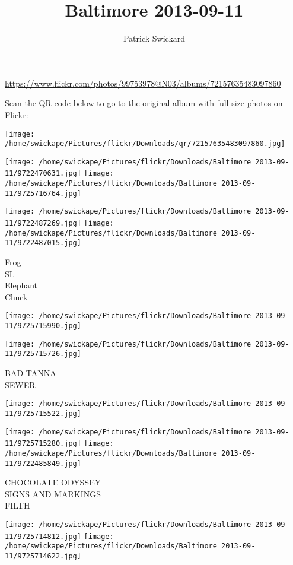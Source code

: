 \documentclass[10pt,letterpaper]{article}
\title{Baltimore 2013-09-11}
\author{Patrick Swickard}
\date{}
\begin{document}
\maketitle

\url{https://www.flickr.com/photos/99753978@N03/albums/72157635483097860}

Scan the QR code below to go to the original album with full-size photos on Flickr:

\texttt{[image: /home/swickape/Pictures/flickr/Downloads/qr/72157635483097860.jpg]}
\pagebreak

\texttt{[image: /home/swickape/Pictures/flickr/Downloads/Baltimore 2013-09-11/9722470631.jpg]}
\texttt{[image: /home/swickape/Pictures/flickr/Downloads/Baltimore 2013-09-11/9725716764.jpg]}

\texttt{[image: /home/swickape/Pictures/flickr/Downloads/Baltimore 2013-09-11/9722487269.jpg]}
\texttt{[image: /home/swickape/Pictures/flickr/Downloads/Baltimore 2013-09-11/9722487015.jpg]}

Frog\\
SL\\
Elephant\\
Chuck
\pagebreak

\texttt{[image: /home/swickape/Pictures/flickr/Downloads/Baltimore 2013-09-11/9725715990.jpg]}

\vspace{0.25in}
\texttt{[image: /home/swickape/Pictures/flickr/Downloads/Baltimore 2013-09-11/9725715726.jpg]}

BAD TANNA\\
SEWER
\pagebreak

\texttt{[image: /home/swickape/Pictures/flickr/Downloads/Baltimore 2013-09-11/9725715522.jpg]}

\vspace{0.25in}
\texttt{[image: /home/swickape/Pictures/flickr/Downloads/Baltimore 2013-09-11/9725715280.jpg]}
\texttt{[image: /home/swickape/Pictures/flickr/Downloads/Baltimore 2013-09-11/9722485849.jpg]}

CHOCOLATE ODYSSEY\\
SIGNS AND MARKINGS\\
FILTH
\pagebreak

\texttt{[image: /home/swickape/Pictures/flickr/Downloads/Baltimore 2013-09-11/9725714812.jpg]}
\texttt{[image: /home/swickape/Pictures/flickr/Downloads/Baltimore 2013-09-11/9725714622.jpg]}
\end{document}

